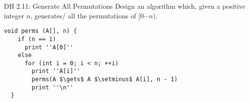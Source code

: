 % 

\begin{frame}[fragile]{}
  \begin{exampleblock}{DH 2.11: Generate All Permutations}
    Design an algorithm which, given a positive integer $n$,
    generates/ all the permutations of $[0 \cdots n)$.
  \end{exampleblock}

  \pause
  \begin{lstlisting}[style = Cstyle]
  void perms (A[], n) {
    if (n == 1)
      print ''A[0]''
    else 
      for (int i = 0; i < n; ++i)
        print ''A[i]''
        perms(A $\gets$ A $\setminus$ A[i], n - 1)
        print ''\n''
  }
  \end{lstlisting}

  \vspace{0.30cm}
  \pause
  \centerline{\texttt{}}
\end{frame}

\begin{frame}{}
  \begin{columns}
    \pause
  \end{columns}
\end{frame}

